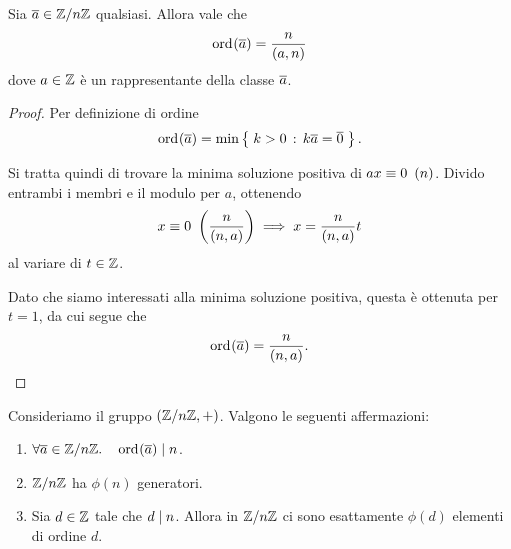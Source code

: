 \begin{proposition}
     \label{prop:ord_in_Z/nZ}
    Sia $\eqclass a \in \Zmod n$ qualsiasi. Allora vale che \[
        \ord{\eqclass a} = \frac{n}{\mcd{a}{n}}    
    \] dove $a \in \mathbb{Z}$ è un rappresentante della classe $\eqclass a$.
\end{proposition}
\begin{proof}
    Per definizione di ordine \[
        \ord{\eqclass a} = \min \set{k > 0 \suchthat k \eqclass a = \eqclass 0}.    
    \]

    Si tratta quindi di trovare la minima soluzione positiva di $ax \equiv 0 \ \left(n\right)$. Divido entrambi i membri e il modulo per $a$, ottenendo \[
        x \equiv 0 \ \left(\frac{n}{\left(n, a\right)}\right) \implies x = \frac{n}{\left(n, a\right)}t    
    \] al variare di $t \in \mathbb{Z}$. 

    Dato che siamo interessati alla minima soluzione positiva, questa è ottenuta per $t = 1$, da cui segue che \[
        \ord{\eqclass a} = \frac{n}{\mcd{n}{a}}. \qedhere    
    \]
\end{proof}

\begin{corollary}
    \label{cor:cons_ord_in_Z/nZ}
    Consideriamo il gruppo $(\mathbb{Z}/n\mathbb{Z}, +)$. Valgono le seguenti affermazioni:
    \begin{enumerate}[label={(\roman*)}, ref={\theproposition: (\roman*)}]
        \item \label{cor:cons_ord_in_Z/nZ:ord_a_div_n} $\forall \eqclass{a} \in \Zmod{n}. \quad \ord{\eqclass a} \divides n$.
        \item \label{cor:cons_ord_in_Z/nZ:phi(n)_gen} $\mathbb{Z}/n\mathbb{Z}$ ha $\phi(n)$ generatori.
        \item \label{cor:cons_ord_in_Z/nZ:phi(d)_el} Sia $d \in \mathbb{Z}$ tale che $d \mid n$. Allora in $\mathbb{Z}/n\mathbb{Z}$ ci sono esattamente $\phi(d)$ elementi di ordine $d$.
    \end{enumerate}
\end{corollary}

